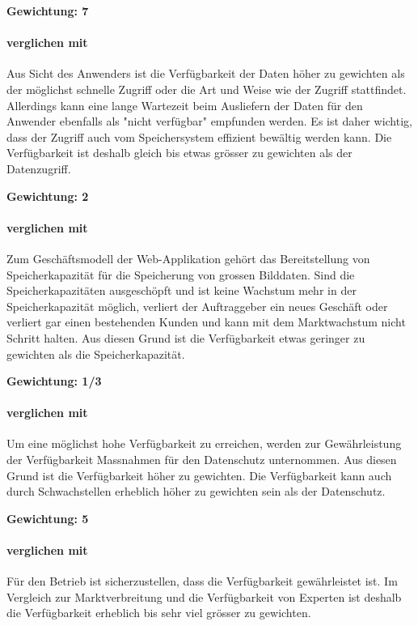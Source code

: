 \textbf{Gewichtung: 7}

\paragraph*{ verglichen mit }
Aus Sicht des Anwenders ist die Verfügbarkeit der Daten höher zu gewichten als der möglichst schnelle Zugriff oder die Art und Weise wie der Zugriff stattfindet. Allerdings kann eine lange Wartezeit beim Ausliefern der Daten für den Anwender ebenfalls als "nicht verfügbar" empfunden werden.  Es ist daher wichtig, dass der Zugriff auch vom Speichersystem effizient bewältig werden kann. Die Verfügbarkeit ist deshalb gleich bis etwas grösser zu gewichten als der Datenzugriff.

\textbf{Gewichtung: 2}

\paragraph*{ verglichen mit }
Zum Geschäftsmodell der Web-Applikation gehört das Bereitstellung von Speicherkapazität für die Speicherung von grossen Bilddaten. Sind die Speicherkapazitäten ausgeschöpft und ist keine Wachstum mehr in der Speicherkapazität möglich, verliert der Auftraggeber ein neues Geschäft oder verliert gar einen bestehenden Kunden und kann mit dem Marktwachstum nicht Schritt halten. Aus diesen Grund ist die Verfügbarkeit etwas geringer zu gewichten als die Speicherkapazität.

\textbf{Gewichtung: 1/3}

\paragraph*{ verglichen mit }
Um eine möglichst hohe Verfügbarkeit zu erreichen, werden zur Gewährleistung der Verfügbarkeit Massnahmen für den Datenschutz unternommen. Aus diesen Grund ist die Verfügbarkeit höher zu gewichten. 
Die Verfügbarkeit kann auch durch Schwachstellen erheblich höher zu gewichten sein als der Datenschutz.

\textbf{Gewichtung: 5}

\paragraph*{ verglichen mit }
Für den Betrieb ist sicherzustellen, dass die Verfügbarkeit gewährleistet ist. Im Vergleich zur Marktverbreitung und die Verfügbarkeit von Experten ist deshalb die Verfügbarkeit erheblich bis sehr viel grösser zu gewichten.

